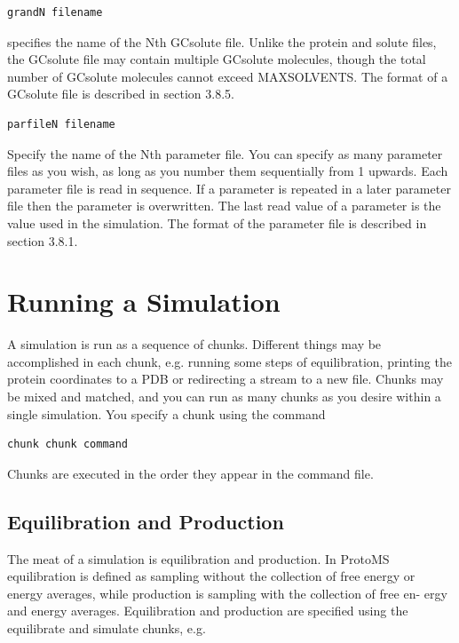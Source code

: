 \documentclass[letterpaper,10pt,english]{sphinxmanual}
\begin{document}
\begin{Verbatim}[commandchars=\\\{\}]
grandN filename
\end{Verbatim}

specifies the name of the Nth GCsolute file. Unlike the protein and solute files, the GCsolute file may contain multiple GCsolute molecules, though the total number of GCsolute molecules cannot exceed MAXSOLVENTS. The format of a GCsolute file is described in section 3.8.5.

\begin{Verbatim}[commandchars=\\\{\}]
parfileN filename
\end{Verbatim}

Specify the name of the Nth parameter file. You can specify as many parameter files as you wish, as long as you number them sequentially from 1 upwards. Each parameter file is read in sequence. If a parameter is repeated in a later parameter file then the parameter is overwritten. The last read value of a parameter is the value used in the simulation. The format of the parameter file is described in section 3.8.1.


\section{Running a Simulation}
\label{protoms:running-a-simulation}
A simulation is run as a sequence of chunks. Different things may be accomplished in each chunk, e.g. running some steps of equilibration, printing the protein coordinates to a PDB or redirecting a stream to a new file. Chunks may be mixed and matched, and you can run as many chunks as you desire within a single simulation. You specify a chunk using the command

\begin{Verbatim}[commandchars=\\\{\}]
chunk chunk command
\end{Verbatim}

Chunks are executed in the order they appear in the command file.


\subsection{Equilibration and Production}
\label{protoms:equilibration-and-production}
The meat of a simulation is equilibration and production. In ProtoMS equilibration is defined as sampling without the collection of free energy or energy averages, while production is sampling with the collection of free en- ergy and energy averages. Equilibration and production are specified using the equilibrate and simulate chunks, e.g.
\end{document}
